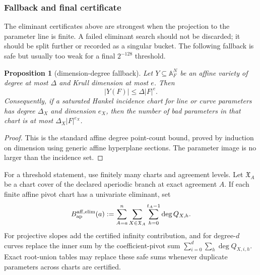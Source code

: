 \documentclass[11pt]{article}
\newtheorem{proposition}[proposition]{Proposition}
\theoremstyle{definition}
\theoremstyle{remark}
\begin{document}
\subsubsection{Fallback and final certificate}

The eliminant certificates above are strongest when the projection to the
parameter line is finite.  A failed eliminant search should not be discarded; it
should be split further or recorded as a singular bucket.  The following fallback
is safe but usually too weak for a final $2^{-128}$ threshold.

\begin{proposition}[dimension-degree fallback]
\label{prop:dimension-degree-fallback}
Let $Y\subseteq\mathbb A^N_F$ be an affine variety of degree at most $\Delta$ and
Krull dimension at most $e$.  Then
\[
        |Y(F)|\le \Delta |F|^e .
\]
Consequently, if a saturated Hankel incidence chart for line or curve parameters
has degree $\Delta_X$ and dimension $e_X$, then the number of bad parameters in
that chart is at most $\Delta_X|F|^{e_X}$.
\end{proposition}

\begin{proof}
This is the standard affine degree point-count bound, proved by induction on
dimension using generic affine hyperplane sections.  The parameter image is no
larger than the incidence set.
\end{proof}

For a threshold statement, use finitely many charts and agreement levels.  Let
$\mathfrak X_A$ be a chart cover of the declared aperiodic branch at exact
agreement $A$.  If each finite affine pivot chart has a univariate eliminant, set
\[
        B_{\rm ap}^{\rm aff,elim}(a)
        :=\sum_{A=a}^n\sum_{X\in\mathfrak X_A}
          \sum_{h=0}^{t_A-1}\deg Q_{X,h} .
\]
For projective slopes add the certified infinity contribution, and for degree-$d$
curves replace the inner sum by the coefficient-pivot sum
$\sum_{i=0}^d\sum_h\deg Q_{X,i,h}$.  Exact root-union tables may replace these
safe sums whenever duplicate parameters across charts are certified.
\end{document}
